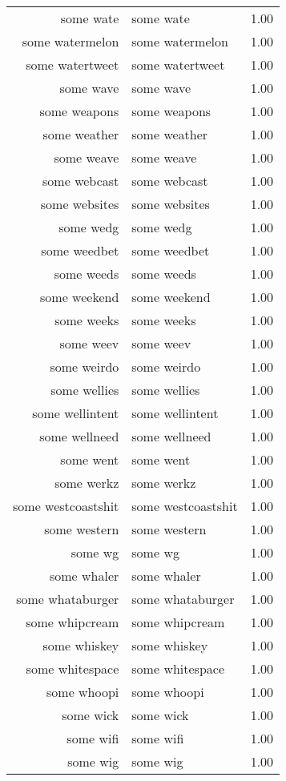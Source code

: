 \begin{table}[ht]
\begin{tabular}{rlr}
  some wate & some wate & 1.00 \\ 
  some watermelon & some watermelon & 1.00 \\ 
  some watertweet & some watertweet & 1.00 \\ 
  some wave & some wave & 1.00 \\ 
  some weapons & some weapons & 1.00 \\ 
  some weather & some weather & 1.00 \\ 
  some weave & some weave & 1.00 \\ 
  some webcast & some webcast & 1.00 \\ 
  some websites & some websites & 1.00 \\ 
  some wedg & some wedg & 1.00 \\ 
  some weedbet & some weedbet & 1.00 \\ 
  some weeds & some weeds & 1.00 \\ 
  some weekend & some weekend & 1.00 \\ 
  some weeks & some weeks & 1.00 \\ 
  some weev & some weev & 1.00 \\ 
  some weirdo & some weirdo & 1.00 \\ 
  some wellies & some wellies & 1.00 \\ 
  some wellintent & some wellintent & 1.00 \\ 
  some wellneed & some wellneed & 1.00 \\ 
  some went & some went & 1.00 \\ 
  some werkz & some werkz & 1.00 \\ 
  some westcoastshit & some westcoastshit & 1.00 \\ 
  some western & some western & 1.00 \\ 
  some wg & some wg & 1.00 \\ 
  some whaler & some whaler & 1.00 \\ 
  some whataburger & some whataburger & 1.00 \\ 
  some whipcream & some whipcream & 1.00 \\ 
  some whiskey & some whiskey & 1.00 \\ 
  some whitespace & some whitespace & 1.00 \\ 
  some whoopi & some whoopi & 1.00 \\ 
  some wick & some wick & 1.00 \\ 
  some wifi & some wifi & 1.00 \\ 
  some wig & some wig & 1.00 \\ 

\end{tabular}
\end{table}
